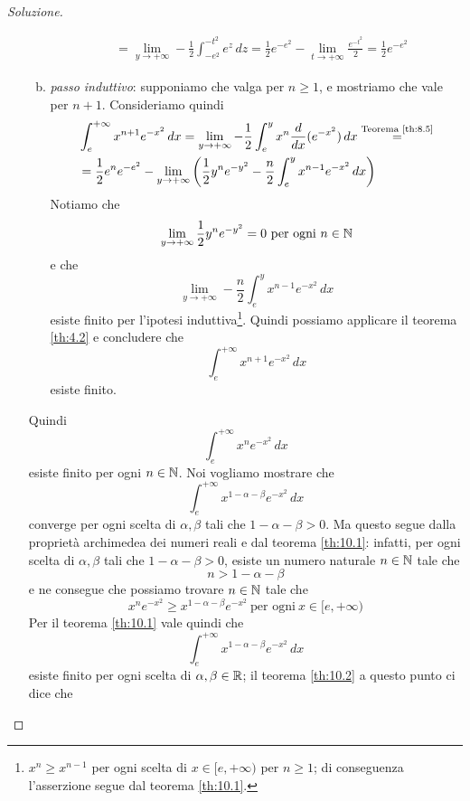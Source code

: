 \begin{proof}[Soluzione]
\begin{enumerate}[(i)]
\begin{enumerate}[(a)]
\[\begin{split}
                & = \lim_{y\to+\infty} -\frac{1}{2}\int_{-e^2}^{-t^2} e^z\, dz = \frac{1}{2}e^{-e^2} - \lim_{t\to +\infty} \frac{e^{-t^2}}{2} = \frac{1}{2}e^{-e^{2}}
            \end{split} 
            \]
            \item \emph{passo induttivo}: supponiamo che valga per $n\ge 1$, e mostriamo che vale per $n+1$. Consideriamo quindi
            \[
            \begin{split}
                & \int_e^{+\infty} x^{n+1}e^{-x^2}\, dx = \lim_{y\to +\infty} -\frac{1}{2} \int_e^y x^n \frac{d}{dx}(e^{-x^2})\, dx \overset{\text{Teorema \ref{th:8.5}}}{=} \\
                & = \frac{1}{2}e^n e^{-e^2}-\lim_{y\to +\infty}\left(\frac{1}{2}y^ne^{-y^2}-\frac{n}{2}\int_e^{y} x^{n-1} e^{-x^2}\, dx\right)
            \end{split} 
            \]
            Notiamo che 
            \[
            \lim_{y\to+\infty} \frac{1}{2}y^n e^{-y^2} = 0 \ \text{per ogni} \ n\in\amsbb{N}
            \]
            e che
            \[
            \lim_{y\to+\infty}-\frac{n}{2}\int_e^y x^{n-1}e^{-x^2}\, dx  
            \]
            esiste finito per l'ipotesi induttiva\footnote{$x^n\ge x^{n-1}$ per ogni scelta di $x\in[e,+\infty)$ per $n\ge 1$; di conseguenza l'asserzione segue dal teorema \ref{th:10.1}.}. Quindi possiamo applicare il teorema \ref{th:4.2} e concludere che
            \[
            \int_e^{+\infty} x^{n+1} e^{-x^2}\, dx
            \]
            esiste finito.
        \end{enumerate}
        Quindi 
        \[
        \int_e^{+\infty} x^n e^{-x^2}\, dx 
        \]
        esiste finito per ogni $n\in\amsbb{N}$. Noi vogliamo mostrare che
        \[
        \int_e^{+\infty} x^{1-\alpha-\beta} e^{-x^2}\, dx
        \]
        converge per ogni scelta di $\alpha, \beta$ tali che $1-\alpha-\beta >0$. Ma questo segue dalla proprietà archimedea dei numeri reali e dal teorema \ref{th:10.1}: infatti, per ogni scelta di $\alpha,\beta$ tali che $1-\alpha-\beta>0$, esiste un numero naturale $n\in\amsbb{N}$ tale che
        \[
        n>1-\alpha-\beta
        \]
        e ne consegue che possiamo trovare $n\in\amsbb{N}$ tale che
        \[
        x^n e^{-x^2}\ge x^{1-\alpha-\beta} e^{-x^2} \ \text{per ogni} \ x\in[e,+\infty)
        \]
        Per il teorema \ref{th:10.1} vale quindi che
        \[
        \int_e^{+\infty} x^{1-\alpha-\beta} e^{-x^2}\, dx
        \]
        esiste finito per ogni scelta di $\alpha, \beta\in\amsbb{R}$; il teorema \ref{th:10.2} a questo punto ci dice che 

\end{enumerate}
\end{proof}
